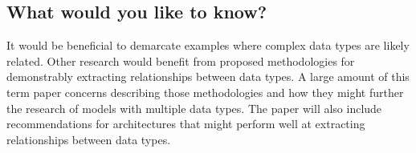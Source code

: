 \subsection{What would you like to know?}

It would be beneficial to demarcate examples where complex data types are likely related.  Other research would benefit from proposed methodologies for demonstrably extracting relationships between data types.  A large amount of this term paper concerns describing those methodologies and how they might further the research of models with multiple data types.  The paper will also include recommendations for architectures that might perform well at extracting relationships between data types.








